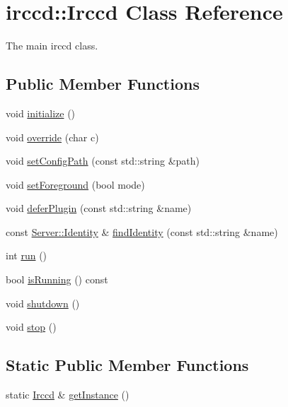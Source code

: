 \hypertarget{a00032}{\section{irccd\-:\-:Irccd Class Reference}
\label{a00032}
}


The main irccd class.  


\subsection*{Public Member Functions}
\begin{DoxyCompactItemize}
\item 
void \hyperlink{a00032_a5f0b233f846b182042befc1b1b5dd4a0}{initialize} ()
\item 
void \hyperlink{a00032_a99dff83038019c1a0be7be7349cbe9ba}{override} (char c)
\item 
void \hyperlink{a00032_a79995420c457e5375d522a4e01a98c39}{set\-Config\-Path} (const std\-::string \&path)
\item 
void \hyperlink{a00032_a157ff3cb14fa910fb1d2cfa6e97ed722}{set\-Foreground} (bool mode)
\item 
void \hyperlink{a00032_a3d6ad58f308a9467657ca6154a80df1a}{defer\-Plugin} (const std\-::string \&name)
\item 
const \hyperlink{a00029}{Server\-::\-Identity} \& \hyperlink{a00032_af981b5a3fbf99978b10ffe5d52222ec7}{find\-Identity} (const std\-::string \&name)
\item 
int \hyperlink{a00032_ac38aca80cf91262e9b99d0483f804eff}{run} ()
\item 
bool \hyperlink{a00032_af2720395c731903d82a469f4bbf6d35b}{is\-Running} () const 
\item 
void \hyperlink{a00032_a170ef2b72ab7b23357c7abe1c2d549ff}{shutdown} ()
\item 
void \hyperlink{a00032_a913876eaf9f7caa2c9d29957ab0e791f}{stop} ()
\end{DoxyCompactItemize}
\subsection*{Static Public Member Functions}
\begin{DoxyCompactItemize}
\item 
static \hyperlink{a00032}{Irccd} \& \hyperlink{a00032_ac073164716a711cfcf683c1a8d5e5281}{get\-Instance} ()
\end{DoxyCompactItemize}


